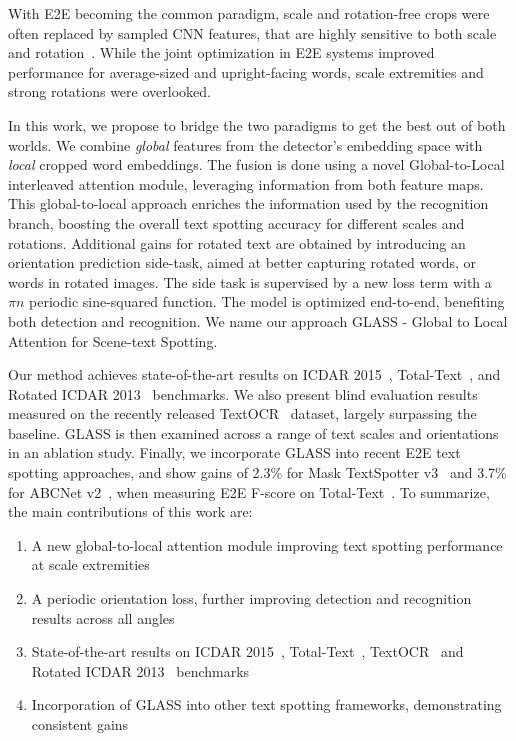 \documentclass[runningheads]{llncs}
\begin{document}
With E2E becoming the common paradigm, scale and rotation-free crops were often replaced by sampled CNN features, that are highly sensitive to both scale and rotation~\cite{Jaderberg2015SpatialTN,Worrall2017HarmonicND}.
While the joint optimization in E2E systems improved performance for average-sized and upright-facing words, scale extremities and strong rotations were overlooked.

In this work, we propose to bridge the two paradigms to get the best out of both worlds.
We combine \emph{global} features from the detector's embedding space with \emph{local} cropped word embeddings.
The fusion is done using a novel Global-to-Local interleaved attention module,
leveraging information from both feature maps.
This global-to-local approach enriches the information used by the recognition branch, boosting the overall text spotting accuracy for different scales and rotations.
Additional gains for rotated text are obtained by introducing an orientation prediction side-task, aimed at better capturing rotated words, or words in rotated images.
The side task is supervised by a new loss term with a $\pi n$ periodic sine-squared function.
The model is optimized end-to-end, benefiting both detection and recognition.
We name our approach GLASS - Global to Local Attention for Scene-text Spotting.

Our method achieves state-of-the-art results on ICDAR 2015~\cite{karatzas2015icdar}, Total-Text~\cite{ch2017total}, and Rotated ICDAR 2013~\cite{liao2020spotterV3} benchmarks.
We also present blind evaluation results measured on the recently released TextOCR~\cite{singh2021textocr} dataset, largely surpassing the baseline.
GLASS is then examined across a range of text scales and orientations in an ablation study. 
Finally, we incorporate GLASS into recent E2E text spotting approaches, and show gains of 2.3\% for Mask TextSpotter v3~\cite{liao2020spotterV3} and 3.7\% for ABCNet v2~\cite{liu2021abcnetV2}, when measuring E2E F-score on Total-Text~\cite{ch2017total}.
To summarize, the  main contributions of this work are:
\begin{enumerate}
    \item A new global-to-local attention module improving text spotting performance at scale extremities
    \item A periodic orientation loss, further improving detection and recognition results across all angles
    \item State-of-the-art results on ICDAR 2015~\cite{karatzas2015icdar}, Total-Text~\cite{ch2017total}, TextOCR~\cite{singh2021textocr} and Rotated ICDAR 2013~\cite{liao2020spotterV3} benchmarks
    \item Incorporation of GLASS into other text spotting frameworks, demonstrating consistent gains
\end{enumerate}
\end{document}

